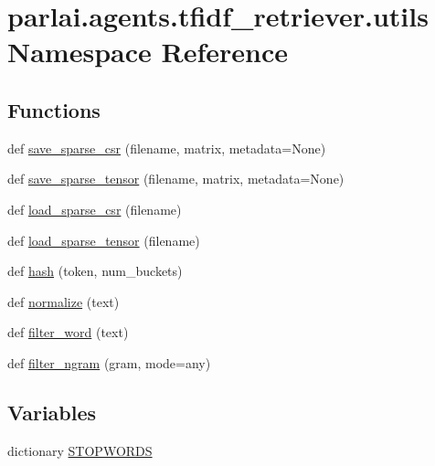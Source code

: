 \hypertarget{namespaceparlai_1_1agents_1_1tfidf__retriever_1_1utils}{}\section{parlai.\+agents.\+tfidf\+\_\+retriever.\+utils Namespace Reference}
\label{namespaceparlai_1_1agents_1_1tfidf__retriever_1_1utils}
\subsection*{Functions}
\begin{DoxyCompactItemize}
\item 
def \hyperlink{namespaceparlai_1_1agents_1_1tfidf__retriever_1_1utils_ad884f6e5806325937ff74a63bc7eea82}{save\+\_\+sparse\+\_\+csr} (filename, matrix, metadata=None)
\item 
def \hyperlink{namespaceparlai_1_1agents_1_1tfidf__retriever_1_1utils_a6d1c2b31f2a5d432d7cb677f436e17c0}{save\+\_\+sparse\+\_\+tensor} (filename, matrix, metadata=None)
\item 
def \hyperlink{namespaceparlai_1_1agents_1_1tfidf__retriever_1_1utils_ac866d85f1378528cb12c8d13b959d279}{load\+\_\+sparse\+\_\+csr} (filename)
\item 
def \hyperlink{namespaceparlai_1_1agents_1_1tfidf__retriever_1_1utils_a28faf0af977db4915cf5253d69d37c0d}{load\+\_\+sparse\+\_\+tensor} (filename)
\item 
def \hyperlink{namespaceparlai_1_1agents_1_1tfidf__retriever_1_1utils_a6df58709964913e04733db89d6e187db}{hash} (token, num\+\_\+buckets)
\item 
def \hyperlink{namespaceparlai_1_1agents_1_1tfidf__retriever_1_1utils_ace97d2139f74e163a7ba81fcfb505f1c}{normalize} (text)
\item 
def \hyperlink{namespaceparlai_1_1agents_1_1tfidf__retriever_1_1utils_a57608b2b9a61223e39e3cb51f5c9f812}{filter\+\_\+word} (text)
\item 
def \hyperlink{namespaceparlai_1_1agents_1_1tfidf__retriever_1_1utils_a791c829884544e127e480a52d233d521}{filter\+\_\+ngram} (gram, mode=\textquotesingle{}any\textquotesingle{})
\end{DoxyCompactItemize}
\subsection*{Variables}
\begin{DoxyCompactItemize}
\item 
dictionary \hyperlink{namespaceparlai_1_1agents_1_1tfidf__retriever_1_1utils_afd1296771f9d4fe64b901825a37b1438}{S\+T\+O\+P\+W\+O\+R\+DS}
\end{DoxyCompactItemize}


